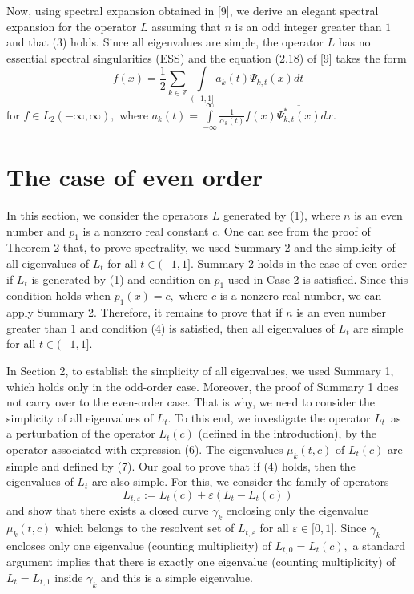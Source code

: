 \documentclass{article}%
\begin{document}
Now, using spectral expansion obtained in [9], we derive an elegant spectral
expansion for the operator $L$ assuming that $n$ is an odd integer greater
than $1$ and that (3) holds. Since all eigenvalues are simple, the operator
$L$ has no essential spectral singularities (ESS) and the equation (2.18) of
[9] takes the form
\begin{equation}
f(x)=\frac{1}{2}%
{\displaystyle\sum\limits_{k\in\mathbb{Z}}}
\int\limits_{(-1,1]}a_{k}(t)\Psi_{k,t}(x)dt \tag{14}%
\end{equation}
for $f\in L_{2}(-\infty,\infty),$ where $a_{k}(t)=%
{\textstyle\int\limits_{-\infty}^{\infty}}
\frac{1}{\alpha_{k}(t)}f(x)\overline{\Psi_{k,t}^{\ast}(x)}dx.$

\section{The case of even order}

In this section, we consider the operators $L$ generated by (1), where $n$ is
an even number and $p_{1}$ is a nonzero real constant $c$. One can see from
the proof of Theorem 2 that, to prove spectrality, we used Summary 2 and the
simplicity of all eigenvalues of $L_{t}$ for all $t\in(-1,1].$ Summary 2 holds
in the case of even order if $L_{t}$ is generated by (1) and condition on
$p_{1}$ used in Case 2 is satisfied. Since this condition holds when
$p_{1}(x)=c,$ where $c$ is a nonzero real number, we can apply Summary 2.
Therefore, it remains to prove that if $n$ is an even number greater than $1$
and condition (4) is satisfied, then all eigenvalues of $L_{t}$ are simple for
all $t\in(-1,1].$

In Section 2, to establish the simplicity of all eigenvalues, we used Summary
1, which holds only in the odd-order case. Moreover, the proof of Summary 1
does not carry over to the even-order case. That is why, we need to consider
the simplicity of all eigenvalues of $L_{t}.$ To this end, we investigate the
operator $L_{t}$\ as a perturbation of the operator $L_{t}(c)$ (defined in the
introduction), by the operator associated with expression (6). The eigenvalues
$\mu_{k}(t,c)$ of $L_{t}(c)$ are simple and defined by (7). Our goal to prove
that if (4) holds, then the eigenvalues of $L_{t}$ are also simple. For this,
we consider the family of operators
\[
L_{t,\varepsilon}:=L_{t}(c)+\varepsilon(L_{t}-L_{t}(c))
\]
and show that there exists a closed curve $\gamma_{k}$ enclosing only the
eigenvalue $\mu_{k}(t,c)$ which belongs to the resolvent set of
$L_{t,\varepsilon}$ for all $\varepsilon\in\lbrack0,1].$ Since $\gamma_{k}$
encloses only one eigenvalue (counting multiplicity) of $L_{t,0}=L_{t}(c),$ a
standard argument implies that there is exactly one eigenvalue (counting
multiplicity) of $L_{t}=L_{t,1}$ inside $\gamma_{k}$ and this is a simple eigenvalue.
\end{document}
